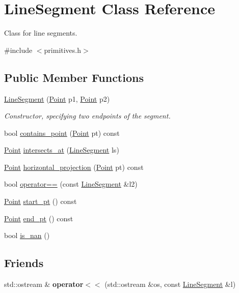 \hypertarget{classLineSegment}{}\section{Line\+Segment Class Reference}
\label{classLineSegment}


Class for line segments.  




{\ttfamily \#include $<$primitives.\+h$>$}

\subsection*{Public Member Functions}
\begin{DoxyCompactItemize}
\item 
\hyperlink{classLineSegment_a691e185edf3aa7e2dc12307f9ef4be6b}{Line\+Segment} (\hyperlink{classPoint}{Point} p1, \hyperlink{classPoint}{Point} p2)
\begin{DoxyCompactList}\small\item\em Constructor, specifying two endpoints of the segment. \end{DoxyCompactList}\item 
bool \hyperlink{classLineSegment_a8dc46fa1dd259befff8cea92232e2a29}{contains\+\_\+point} (\hyperlink{classPoint}{Point} pt) const
\item 
\hyperlink{classPoint}{Point} \hyperlink{classLineSegment_a3bdc73ce4696a76b7c7dd143556c95b6}{intersects\+\_\+at} (\hyperlink{classLineSegment}{Line\+Segment} ls)
\item 
\hyperlink{classPoint}{Point} \hyperlink{classLineSegment_a51a9d2fcca6b3ff03cb51fd4d8fae4ba}{horizontal\+\_\+projection} (\hyperlink{classPoint}{Point} pt) const
\item 
bool \hyperlink{classLineSegment_ae73906b7230adbccf243c4b8dc6482b3}{operator==} (const \hyperlink{classLineSegment}{Line\+Segment} \&l2)
\item 
\hyperlink{classPoint}{Point} \hyperlink{classLineSegment_abe9136323cfe46be663907cbc1e3da2d}{start\+\_\+pt} () const
\item 
\hyperlink{classPoint}{Point} \hyperlink{classLineSegment_aa6c90340de500bb72bdde2114f838d57}{end\+\_\+pt} () const
\item 
bool \hyperlink{classLineSegment_a3364f7089cf7b650efe389475ddd0f12}{is\+\_\+nan} ()
\end{DoxyCompactItemize}
\subsection*{Friends}
\begin{DoxyCompactItemize}
\item 
\mbox{\label{classLineSegment_aa6fe02d7d9f8ce3a0da5f6008b607850}} 
std\+::ostream \& {\bfseries operator$<$$<$} (std\+::ostream \&os, const \hyperlink{classLineSegment}{Line\+Segment} \&l)
\end{DoxyCompactItemize}



